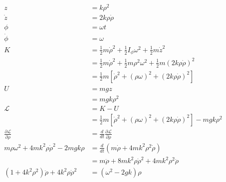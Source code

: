 \documentclass{article}
\begin{document}
\setcounter{subsection}{40}
\subsection{}

\begin{align*}
  z                                                          & = k \rho^2                                                                                           \\
  \dot{z}                                                    & = 2 k \rho \dot{\rho}                                                                                \\
  \phi                                                       & = \omega t                                                                                           \\
  \dot{\phi}                                                 & = \omega                                                                                             \\
  K                                                          & = \frac{1}{2} m \dot{\rho}^2 + \frac{1}{2} I_\phi \omega^2 + \frac{1}{2} m \dot{z}^2                 \\
                                                             & = \frac{1}{2} m \dot{\rho}^2 + \frac{1}{2} m \rho^2 \omega^2 + \frac{1}{2} m (2 k \rho \dot{\rho})^2 \\
                                                             & = \frac{1}{2} m [\dot{\rho}^2 + (\rho \omega)^2 + (2 k \rho \dot{\rho})^2]                           \\
  U                                                          & = m g z                                                                                              \\
                                                             & = m g k \rho^2                                                                                       \\
  \mathcal{L}                                                & = K - U                                                                                              \\
                                                             & = \frac{1}{2} m [\dot{\rho}^2 + (\rho \omega)^2 + (2 k \rho \dot{\rho})^2] - m g k \rho^2            \\
  \frac{\partial \mathcal{L}}{\partial \rho}                 & = \frac{d}{d t} \frac{\partial \mathcal{L}}{\partial \dot{\rho}}                                     \\
  m \rho \omega^2 + 4 m k^2 \rho \dot{\rho}^2 - 2 m g k \rho & = \frac{d}{d t} (m \dot{\rho} + 4 m k^2 \rho^2 \dot{\rho})                                           \\
                                                             & = m \ddot{\rho} + 8 m k^2 \rho \dot{\rho}^2 + 4 m k^2 \rho^2 \ddot{\rho}                             \\
  (1 + 4 k^2 \rho^2) \ddot{\rho} + 4 k^2 \rho \dot{\rho}^2   & = (\omega^2 - 2 g k) \rho
\end{align*}
\end{document}
